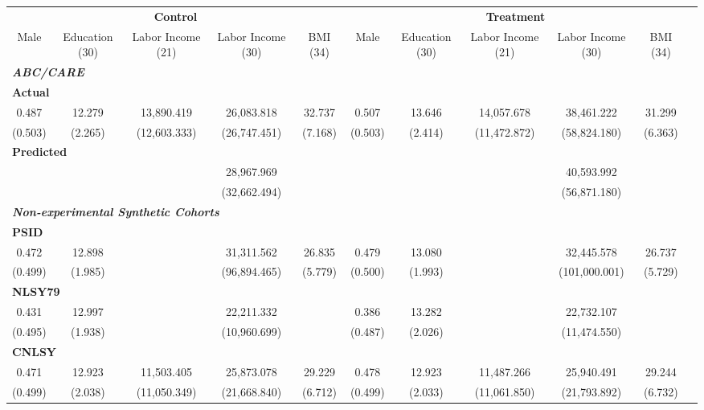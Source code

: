 \begin{tabular}{ccccccccccc} \hline \hline
\multicolumn{5}{c}{\textbf{Control}} & \multicolumn{5}{c}{\textbf{Treatment}} \\
Male  & Education (30)  & Labor Income (21) & Labor Income (30)  & BMI (34) & Male  & Education (30)  & Labor Income (21) & Labor Income (30)  & BMI (34)  \\  \midrule
\multicolumn{10}{l}{\textit{\textbf{ABC/CARE}}} \\
\multicolumn{10}{l}{\textbf{Actual}} \\
    0.487 &    12.279 & 13,890.419 & 26,083.818 &    32.737 &     0.507 &    13.646 & 14,057.678 & 38,461.222 &    31.299 \\  
    (0.503) &     (2.265) & (12,603.333) & (26,747.451) &     (7.168) &     (0.503) &     (2.414) & (11,472.872) & (58,824.180) &     (6.363) \\  
\multicolumn{10}{l}{\textbf{Predicted}} \\
        &         &         & 28,967.969 &         &         &         &         & 40,593.992 &         \\  
        &         &         & (32,662.494) &         &         &         &         & (56,871.180) &         \\  
        \multicolumn{10}{l}{\textit{\textbf{Non-experimental Synthetic Cohorts}}} \\
\multicolumn{10}{l}{\textbf{PSID}} \\
    0.472 &    12.898 &    & 31,311.562 &    26.835 &     0.479 &    13.080 &    & 32,445.578 &    26.737 \\  
    (0.499) &     (1.985) &     & (96,894.465) &     (5.779) &     (0.500) &     (1.993) &      &  (101,000.001) &     (5.729) \\  
\multicolumn{10}{l}{\textbf{NLSY79}} \\
    0.431 &    12.997 &   & 22,211.332 &  &     0.386 &    13.282 &   & 22,732.107 &  \\  
    (0.495) &     (1.938) &   & (10,960.699) & &     (0.487) &     (2.026) &   & (11,474.550) &  \\  
    \multicolumn{10}{l}{\textbf{CNLSY}} \\  
    0.471 &    12.923 & 11,503.405 & 25,873.078 &    29.229 &     0.478  &  12.923 & 11,487.266 & 25,940.491 &    29.244 \\  
    (0.499) &     (2.038) & (11,050.349) & (21,668.840) &     (6.712) &     (0.499) &     (2.033) & (11,061.850) & (21,793.892) &     (6.732) \\ 

\end{tabular}
